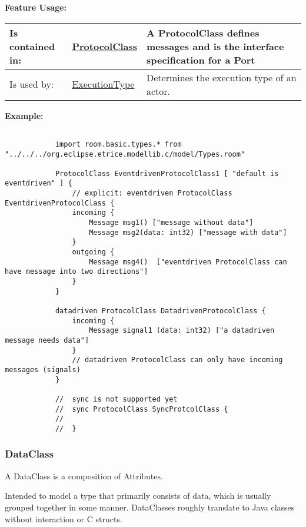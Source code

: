 		
	\begingroup
	\textbf{Feature Usage:}
	\renewcommand{\arraystretch}{1.8} %
	\begin{longtable}{l|l p{}}
		\hline
	Is contained in: & \tabitem \hyperlink{ref:ProtocolClass}{ProtocolClass}  & A ProtocolClass defines messages and is the interface specification for a Port\\
	\hline
	Is used by: & \tabitem \hyperlink{ref:ExecutionType}{ExecutionType}  & Determines the execution type of an actor.\\
	\hline
	\end{longtable}
	\endgroup
		
	\textbf{Example:}
	
			\begin{lstlisting}[language=ROOM]
		
			import room.basic.types.* from "../../../org.eclipse.etrice.modellib.c/model/Types.room"
		
			ProtocolClass EventdrivenProtocolClass1 [ "default is eventdriven" ] {
				// explicit: eventdriven ProtocolClass EventdrivenProtocolClass {
				incoming {
					Message msg1() ["message without data"]
					Message msg2(data: int32) ["message with data"]
				}
				outgoing {
					Message msg4()  ["eventdriven ProtocolClass can have message into two directions"]
				}
			}
		
			datadriven ProtocolClass DatadrivenProtocolClass {
				incoming {
					Message signal1 (data: int32) ["a datadriven message needs data"]
				}
				// datadriven ProtocolClass can only have incoming messages (signals)
			}
			
			//  sync is not supported yet
			//	sync ProtocolClass SyncProtcolClass { 
			//		
			//	}
			\end{lstlisting}
	
	\vspace{\baselineskip}
	\vspace{\baselineskip}
	\vspace{\baselineskip}
	
\subsubsection{DataClass}
	\hypertarget{ref:DataClass}{}
	A DataClass is a composition of Attributes.
		
	Intended to model a type that primarily consists of data, which is usually grouped together in some manner. DataClasses roughly translate to Java classes without interaction or C \textsf{struct}s.
	
